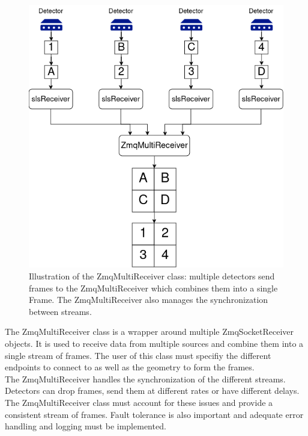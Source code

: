 \begin{spacing}{1.2}
    \begin{figure}
        \centering
        \includegraphics[width=\textwidth]{Chapitre3/figures/zmqmulti.png}
        \caption{Illustration of the ZmqMultiReceiver class: multiple detectors send frames to the ZmqMultiReceiver
            which combines them into a single Frame. The ZmqMultiReceiver also manages the synchronization between streams.}
        \label{fig:zmq_multi_receiver}
    \end{figure}

    The ZmqMultiReceiver class is a wrapper around multiple ZmqSocketReceiver objects. It is used
    to receive data from multiple sources and combine them into a single stream of frames. The user of this class
    must specifiy the different endpoints to connect to as well as the geometry to form the frames.\\

    The ZmqMultiReceiver handles the synchronization of the different streams. Detectors can drop
    frames, send them at different rates or have different delays. The ZmqMultiReceiver class
    must account for these issues and provide a consistent stream of frames. Fault tolerance is also
    important and adequate error handling and logging must be implemented.\\


\end{spacing}
